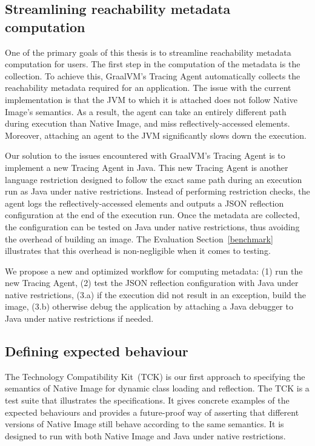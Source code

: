 \subsection{Streamlining reachability metadata computation}
One of the primary goals of this thesis is to streamline reachability metadata computation for users.
The first step in the computation of the metadata is the collection. To achieve this, GraalVM's Tracing Agent automatically collects the reachability metadata required for an application. The issue with the current implementation is that the JVM to which it is attached does not follow Native Image's semantics. As a result, the agent can take an entirely different path during execution than Native Image, and miss reflectively-accessed elements. Moreover, attaching an agent to the JVM significantly slows down the execution.

Our solution to the issues encountered with GraalVM's Tracing Agent is to implement a new Tracing Agent in Java. This new Tracing Agent is another language restriction designed to follow the exact same path during an execution run as Java under native restrictions. Instead of performing restriction checks, the agent logs the reflectively-accessed elements and outputs a JSON reflection configuration at the end of the execution run. 
Once the metadata are collected, the configuration can be tested on Java under native restrictions, thus avoiding the overhead of building an image. The Evaluation Section~\ref{benchmark} illustrates that this overhead is non-negligible when it comes to testing.  

We propose a new and optimized workflow for computing metadata: (1) run the new Tracing Agent, (2) test the JSON reflection configuration with Java under native restrictions, (3.a) if the execution did not result in an exception, build the image, (3.b) otherwise debug the application by attaching a Java debugger to Java under native restrictions if needed.

\subsection{Defining expected behaviour}
The Technology Compatibility Kit~(TCK) is our first approach to specifying the semantics of Native Image for dynamic class loading and reflection. The TCK is a test suite that illustrates the specifications. It gives concrete examples of the expected behaviours and provides a future-proof way of asserting that different versions of Native Image still behave according to the same semantics.
It is designed to run with both Native Image and Java under native restrictions.

